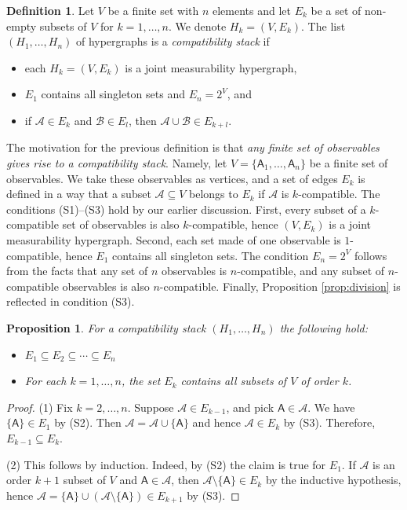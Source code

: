 \documentclass[12pt]{amsart}
\newtheorem{proposition}{Proposition}
\theoremstyle{definition}
\newtheorem{definition}{Definition}
\newcommand{\A}{\mathsf{A}}%
\begin{document}
\begin{definition}
\label{def:stack}
Let $V$ be a finite set with $n$ elements and let $E_k$ be a set of non-empty subsets of $V$ for $k=1,\ldots,n$.
We denote $H_k=(V,E_k)$.
The list $(H_1,\ldots,H_n)$ of hypergraphs is a \emph{compatibility stack} if
\begin{itemize}[leftmargin=*,labelsep=4mm]
\item[(S1)] each $H_k=(V,E_k)$ is a joint measurability hypergraph,
\item[(S2)] $E_1$ contains all singleton sets and $E_n =2^V$, and
\item[(S3)] if $\mathcal{A}\in E_k$ and $\mathcal{B}\in E_l$, then $\mathcal{A}\cup\mathcal{B}\in E_{k+l}$.
\end{itemize}
\end{definition}

The motivation for the previous definition is that 
\emph{any finite set of observables gives rise to a compatibility stack}.
Namely, let $V=\{\A_1, \ldots, \A_n\}$ be a finite set of observables.
We take these observables as vertices, and a set of edges $E_k$ is defined in a way that a subset $\mathcal{A}\subseteq V$ belongs to $E_k$ if $\mathcal{A}$ is $k$-compatible.
The conditions (S1)--(S3) hold by our earlier discussion. 
First, every subset of a $k$-compatible set of observables is also $k$-compatible, hence $(V,E_k)$ is a joint measurability hypergraph.
Second, each set made of one observable is $1$-compatible, hence $E_1$ contains all singleton sets. 
The condition $E_n=2^V$ follows from the facts that any set of $n$ observables is $n$-compatible, and any subset of $n$-compatible observables is also $n$-compatible.
Finally, Proposition \ref{prop:division} is reflected in condition (S3). 

\begin{proposition}
\label{prop:stack}
For a compatibility stack $(H_1,\ldots,H_n)$ the following hold:
\begin{itemize}[leftmargin=*,labelsep=3mm]
\item[(1)] $E_1 \subseteq E_2 \subseteq \cdots \subseteq E_n$
\item[(2)] For each $k=1,\ldots,n$, the set $E_k$ contains all subsets of $V$ of order $k$.
\end{itemize}
\end{proposition}

\begin{proof}
(1) Fix $k=2,\ldots,n$. Suppose $\mathcal{A}\in E_{k-1}$, and pick $\A\in\mathcal{A}$. We have $\{\A\}\in E_1$ by (S2).
Then $\mathcal{A} = \mathcal{A} \cup \{\A\}$ and hence $\mathcal{A}\in E_{k}$ by (S3).
Therefore, $E_{k-1} \subseteq E_{k}$.

(2) This follows by  induction. Indeed, by (S2) the claim is true for $E_1$. If $\mathcal{A}$ is an order $k+1$ subset of $V$ and $\A\in\mathcal{A}$, then $\mathcal{A}\setminus\{\A\}\in E_k$ by the inductive hypothesis, hence $\mathcal{A} = \{\A\}\cup(\mathcal{A}\setminus\{\A\}) \in E_{k+1}$ by (S3).
\end{proof}
\end{document}
